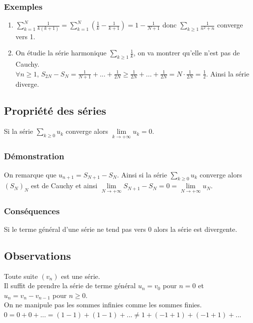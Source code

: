 \documentclass[a4paper,10pt]{book} %
\newcommand{\displayAmath}{\displaystyle}
\begin{document}
\subsubsection{Exemples}
\begin{enumerate}
\item$\displayAmath \sum_{k=1}^{N}\frac{1}{k(k+1)}=\sum_{k=1}^N(\frac{1}{k}-\frac{1}{k+1})=1-\frac{1}{N+1}$ donc $\displayAmath\sum_{k\geq 1}\frac{1}{n^2+n}$ converge vers 1.

\item On étudie la série harmonique $\displayAmath\sum_{k\geq 1}\frac{1}{k}$, on va montrer qu'elle n'est pas de Cauchy.\\$\forall n\geq 1$, $S_{2N}-S_N=\frac{1}{N+1}+...+\frac{1}{2N}\geq \frac{1}{2N}+...+\frac{1}{2N}=N\cdot \frac{1}{2N}=\frac{1}{2}$.
Ainsi la série diverge.
\end{enumerate}

\newpage

\subsection{Propriété des séries}
Si la série $\displayAmath\sum_{k\geq 0}u_k$ converge alors $\lim\limits_{k\rightarrow+\infty}u_k=0$.

\subsubsection{Démonstration}
On remarque que $u_{n+1}=S_{N+1}-S_N$. Ainsi si la série $\displayAmath\sum_{k\geq 0}u_k$ converge alors $(S_N)_N$ est de Cauchy et ainsi $\lim\limits_{N\rightarrow+\infty}S_{N+1}-S_N=0=\lim\limits_{N\rightarrow+\infty}u_N$.

\subsubsection{Conséquences}
Si le terme général d'une série ne tend pas vers 0 alors la série est divergente.

\subsection{Observations}
Toute suite $(v_n)$ est une série.\\
Il suffit de prendre la série de terme général $u_n=v_0$ pour $n=0$ et $u_n=v_n-v_{n-1}$ pour $n \geq 0$.\\

On ne manipule pas les sommes infinies comme les sommes finies.\\
$0=0+0+...=(1-1)+(1-1)+...\neq 1+(-1+1)+(-1+1)+...$
\end{document}

